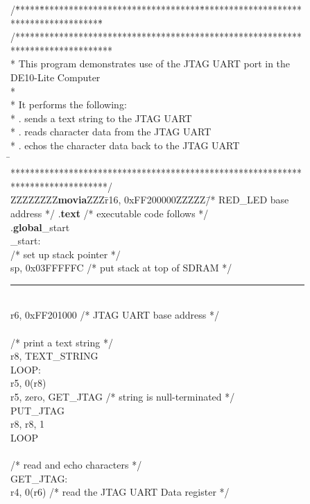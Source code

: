 \begin{figure}[h!]
\begin{center}
\begin{minipage}[t]{12.5 cm}
\begin{tabbing}
/\=*****\=*********************************\=****************************************\=\kill
/********************************************************************************\\
\>* This program demonstrates use of the JTAG UART port in the DE10-Lite Computer\\
\>*\\
\>* It performs the following: \\
\>* . sends a text string to the JTAG UART\\
\>* . reads character data from the JTAG UART\\
\>* . echos the character data back to the JTAG UART\\
\=\kill
\>********************************************************************************/\\
ZZZZZZZZ\={\bf movia}ZZZ\=r16, 0xFF200000ZZZZZ\=/* RED\_LED base address */\kill
\>.{\bf text}	\>\>/* executable code follows */\\
\>.{\bf global}\>\_start\\
\_start:\\
\>/* set up stack pointer */\\
 \>sp, 0x03FFFFFC \>/* put stack at top of SDRAM */\\
\rule{6.0in}{0in}~\\
 \>r6, 0xFF201000 \>/* JTAG UART base address */\\
\\
\>/* print a text string */\\
 \>r8, TEXT\_STRING\\
LOOP:\\
 \>r5, 0(r8)\\
 \>r5, zero, GET\_JTAG \>/* string is null-terminated */\\
 \>PUT\_JTAG\\
 \>r8, r8, 1\\
 \>LOOP\\
~\\
\>/* read and echo characters */\\
GET\_JTAG:\\
 \>r4, 0(r6) \>/* read the JTAG UART Data register */\\

\end{tabbing}
\end{minipage}
\end{center}
\end{figure}
